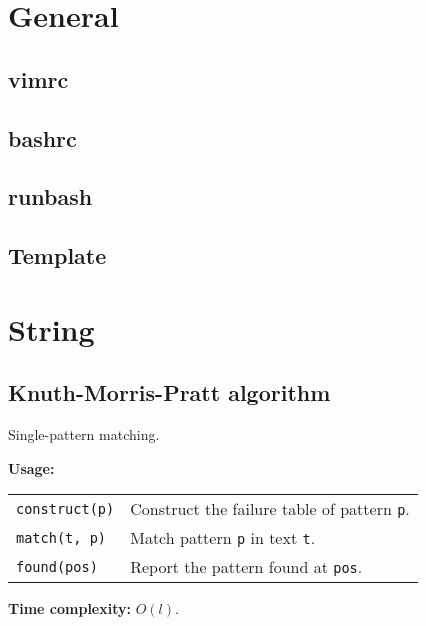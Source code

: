 
\newcommand{\BookNo}{0}
\newcommand{\BookTitle}{Miscellaneous}


\setmainfont{Times New Roman}
\setlength{\parskip}{0.0in}
\tableofcontents
\setlength{\parskip}{0.1in}
\newevenpage
\section{General}

\subsection{vimrc}


\subsection{bashrc}


\subsection{runbash}


\subsection{Template}


\section{String}
\subsection{Knuth-Morris-Pratt algorithm}
Single-pattern matching. \par
\textbf{Usage:} \\[0.1cm]
\begin{tabular}{p{2.5cm} p{9cm}}
  \lstinline|construct(p)| & Construct the failure table of pattern \lstinline|p|. \\
  \lstinline|match(t, p)| & Match pattern \lstinline|p| in text \lstinline|t|. \\
  \lstinline|found(pos)| & Report the pattern found at \lstinline|pos|. \\
\end{tabular} \par
\textbf{Time complexity:} $O(l)$. \par


